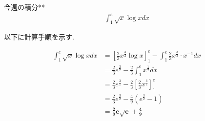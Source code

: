 \documentclass[main]{subfiles}
\begin{document}

\begin{mondai}{8}{今週の積分}{**}
    \begin{align*}
        \int_1^e \sqrt{x}\log x dx
    \end{align*}
\end{mondai}


\solutionhead
\hfill
以下に計算手順を示す.
\hfill\

\begin{align*}
    \int_1^e \sqrt{x}\log x dx
        &= \left[\frac{2}{3}x^\frac{3}{2}\log x\right]_1^e-\int_1^e \frac{2}{3}x^\frac{3}{2}\cdot x^{-1}dx \\
        &= \frac{2}{3}e^\frac{3}{2}-\frac{2}{3}\int_1^ex^\frac{1}{2} dx \\
        &= \frac{2}{3}e^\frac{3}{2}-\frac{2}{3}\left[\frac{2}{3}x^\frac{3}{2}\right]_1^e \\
        &= \frac{2}{3}e^\frac{3}{2}-\frac{4}{9}\left(e^\frac{3}{2}-1\right) \\
        &= \boldsymbol{\frac{2}{9}e\sqrt{e}+\frac{4}{9}}
\end{align*}
\end{document}
